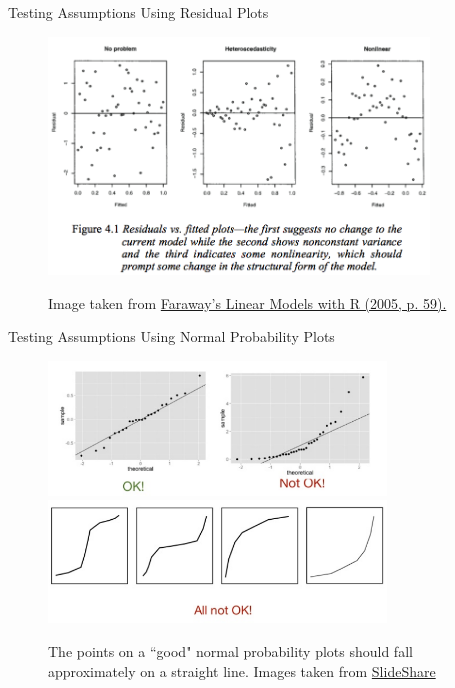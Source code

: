 \documentclass[xcolor=svgnames, handout]{beamer}
\begin{document}
\begin{frame}[label=current]{Testing Assumptions Using Residual Plots}
\begin{figure}[htbp]
\caption{Image taken from \href{https://books.google.ca/books?id=i0DOBQAAQBAJ&printsec=frontcover&dq=Faraway\%27s+Linear+Models+with+R+(2005,+p.+59).\&hl=en\&sa=X\&ved=0ahUKEwinqMbTjq3iAhVhMX0KHedMCnkQ6AEIMjAB\#v=onepage\&q\&f=false}{Faraway's Linear Models with R (2005, p. 59).} }
\begin{center}
\includegraphics[width=0.9\textwidth]{img/resplot.png}
\label{default}
\end{center}
\end{figure}
\end{frame}

\begin{frame}[label=current]{Testing Assumptions Using Normal Probability Plots}
\begin{figure}[htbp]
\caption{The points on a ``good" normal probability plots should fall approximately on a straight line.   Images taken from \href{https://www.slideshare.net/saqibshahzad26/26-assumptions}{SlideShare} }
\begin{center}
\includegraphics[width=0.8\textwidth]{img/ppplot}\\
\includegraphics[width=0.8\textwidth]{img/notok}
\label{default}
\end{center}
\end{figure}
\end{frame}
\end{document}
